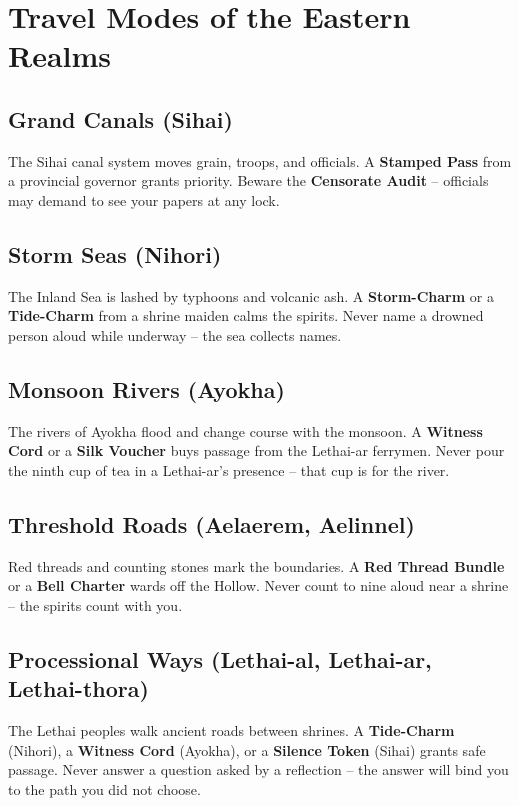 \documentclass[12pt,oneside]{book}
\begin{document}
\section*{Travel Modes of the Eastern Realms}

\subsection*{Grand Canals (Sihai)}
The Sihai canal system moves grain, troops, and officials. A \textbf{Stamped Pass} from a provincial governor grants priority. Beware the \textbf{Censorate Audit} -- officials may demand to see your papers at any lock.

\subsection*{Storm Seas (Nihori)}
The Inland Sea is lashed by typhoons and volcanic ash. A \textbf{Storm-Charm} or a \textbf{Tide-Charm} from a shrine maiden calms the spirits. Never name a drowned person aloud while underway -- the sea collects names.

\subsection*{Monsoon Rivers (Ayokha)}
The rivers of Ayokha flood and change course with the monsoon. A \textbf{Witness Cord} or a \textbf{Silk Voucher} buys passage from the Lethai-ar ferrymen. Never pour the ninth cup of tea in a Lethai-ar's presence -- that cup is for the river.

\subsection*{Threshold Roads (Aelaerem, Aelinnel)}
Red threads and counting stones mark the boundaries. A \textbf{Red Thread Bundle} or a \textbf{Bell Charter} wards off the Hollow. Never count to nine aloud near a shrine -- the spirits count with you.

\subsection*{Processional Ways (Lethai-al, Lethai-ar, Lethai-thora)}
The Lethai peoples walk ancient roads between shrines. A \textbf{Tide-Charm} (Nihori), a \textbf{Witness Cord} (Ayokha), or a \textbf{Silence Token} (Sihai) grants safe passage. Never answer a question asked by a reflection -- the answer will bind you to the path you did not choose.
\end{document}
